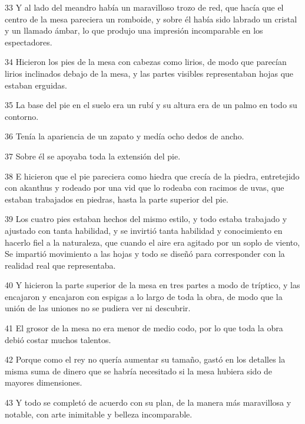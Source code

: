 \par 33 Y al lado del meandro había un maravilloso trozo de red, que hacía que el centro de la mesa pareciera un romboide, y sobre él había sido labrado un cristal y un llamado ámbar, lo que produjo una impresión incomparable en los espectadores.

\par 34 Hicieron los pies de la mesa con cabezas como lirios, de modo que parecían lirios inclinados debajo de la mesa, y las partes visibles representaban hojas que estaban erguidas.

\par 35 La base del pie en el suelo era un rubí y su altura era de un palmo en todo su contorno.

\par 36 Tenía la apariencia de un zapato y medía ocho dedos de ancho.

\par 37 Sobre él se apoyaba toda la extensión del pie.

\par 38 E hicieron que el pie pareciera como hiedra que crecía de la piedra, entretejido con akanthus y rodeado por una vid que lo rodeaba con racimos de uvas, que estaban trabajados en piedras, hasta la parte superior del pie.

\par 39 Los cuatro pies estaban hechos del mismo estilo, y todo estaba trabajado y ajustado con tanta habilidad, y se invirtió tanta habilidad y conocimiento en hacerlo fiel a la naturaleza, que cuando el aire era agitado por un soplo de viento, Se impartió movimiento a las hojas y todo se diseñó para corresponder con la realidad real que representaba.

\par 40 Y hicieron la parte superior de la mesa en tres partes a modo de tríptico, y las encajaron y encajaron con espigas a lo largo de toda la obra, de modo que la unión de las uniones no se pudiera ver ni descubrir.

\par 41 El grosor de la mesa no era menor de medio codo, por lo que toda la obra debió costar muchos talentos.

\par 42 Porque como el rey no quería aumentar su tamaño, gastó en los detalles la misma suma de dinero que se habría necesitado si la mesa hubiera sido de mayores dimensiones.

\par 43 Y todo se completó de acuerdo con su plan, de la manera más maravillosa y notable, con arte inimitable y belleza incomparable.

